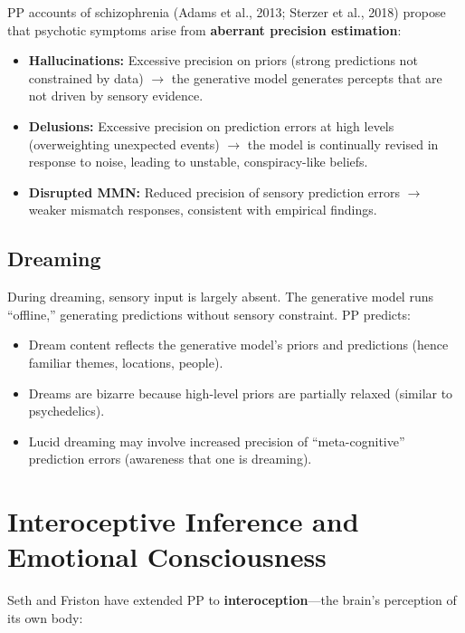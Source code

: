 \documentclass[11pt,a4paper]{report}
\begin{document}
PP accounts of schizophrenia (Adams et al., 2013; Sterzer et al., 2018) propose that psychotic symptoms arise from \textbf{aberrant precision estimation}:

\begin{itemize}[leftmargin=1.5em]
  \item \textbf{Hallucinations:} Excessive precision on priors (strong predictions not constrained by data) $\to$ the generative model generates percepts that are not driven by sensory evidence.
  \item \textbf{Delusions:} Excessive precision on prediction errors at high levels (overweighting unexpected events) $\to$ the model is continually revised in response to noise, leading to unstable, conspiracy-like beliefs.
  \item \textbf{Disrupted MMN:} Reduced precision of sensory prediction errors $\to$ weaker mismatch responses, consistent with empirical findings.
\end{itemize}

\subsection{Dreaming}

During dreaming, sensory input is largely absent. The generative model runs ``offline,'' generating predictions without sensory constraint. PP predicts:
\begin{itemize}[leftmargin=1.5em]
  \item Dream content reflects the generative model's priors and predictions (hence familiar themes, locations, people).
  \item Dreams are bizarre because high-level priors are partially relaxed (similar to psychedelics).
  \item Lucid dreaming may involve increased precision of ``meta-cognitive'' prediction errors (awareness that one is dreaming).
\end{itemize}

\section{Interoceptive Inference and Emotional Consciousness}

Seth and Friston have extended PP to \textbf{interoception}---the brain's perception of its own body:
\end{document}
